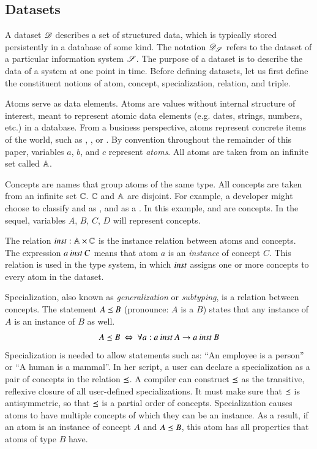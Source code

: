 \documentclass{elsarticle}
\begin{document}
\subsection{Datasets}
\label{sct:Datasets}
   A dataset $\mathscr{D}$ describes a set of structured data, which is typically stored persistently in a database of some kind.
   The notation $\mathscr{D}_{\mathscr{S}}$ refers to the dataset of a particular information system $\mathscr{S}$.
   The purpose of a dataset is to describe the data of a system at one point in time. 
   Before defining datasets, let us first define the constituent notions of atom, concept, specialization, relation, and triple.
   
   Atoms serve as data elements.
   Atoms are values without internal structure of interest, meant to represent atomic data elements (e.g. dates, strings, numbers, etc.) in a database.
   From a business perspective, atoms represent concrete items of the world,
   such as , , or .
   By convention throughout the remainder of this paper, variables $a$, $b$, and $c$ represent \emph{atoms}.
   All atoms are taken from an infinite set called $\mathbb{A}$.
   
   Concepts are names that group atoms of the same type.
   All concepts are taken from an infinite set $\mathbb{C}$.
   $\mathbb{C}$ and $\mathbb{A}$ are disjoint.
   For example, a developer might choose to classify  and  as ,
   and  as a .
   In this example,  and  are concepts.
   In the sequel, variables $A$, $B$, $C$, $D$ will represent concepts.

   The relation $\mathbin{\text{\it inst\/}}:\mathbb{A}\times\mathbb{C}$ is the instance relation between atoms and concepts.
   The expression $a\mathbin{\text{\it inst\/}} C$ means that atom $a$ is an \emph{instance} of concept $C$.
   This relation is used in the type system, in which $\mathbin{\text{\it inst\/}}$ assigns one or more concepts to every atom in the dataset.

   Specialization, also known as {\em generalization} or {\em subtyping}, is a relation between concepts.
   The statement $A\preceq B$ (pronounce: $A$ is a $B$) states that any instance of $A$ is an instance of $B$ as well.
\begin{equation}
   \label{eqn:specialization}
   A\preceq B\ \Leftrightarrow\ \forall a: a\mathbin{\text{\it inst\/}} A\rightarrow a\mathbin{\text{\it inst\/}} B
\end{equation}
   Specialization is needed to allow statements such as: ``An employee is a person'' or ``A human is a mammal''.
   In her script, a user can declare a specialization as a pair of concepts in the relation $\preceq$.
   A compiler can construct $\preceq$ as the transitive, reflexive closure of all user-defined specializations.
   It must make sure that $\preceq$ is antisymmetric, so that $\preceq$ is a partial order of concepts.
   Specialization causes atoms to have multiple concepts of which they can be an instance.
   As a result, if an atom is an instance of concept $A$ and $A\preceq B$,
   this atom has all properties that atoms of type $B$ have.
\end{document}

